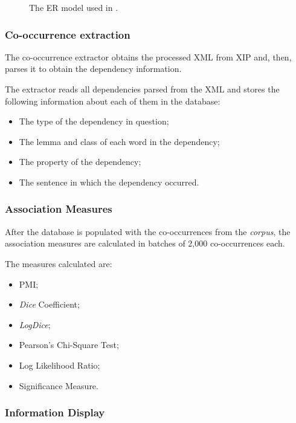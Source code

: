 \begin{figure}[ht]
\caption[ER model of (Correia et al. 2015)]{The \ac{ER} model used in
	\citep{correia2015syntax}.}
\label{fig:correira2015er}
\centering

\end{figure}

\subsubsection*{Co-occurrence extraction}

The co-occurrence extractor obtains the processed \ac{XML} from \ac{XIP} and, 
then, parses it to obtain the dependency information.

The extractor reads all dependencies parsed from the \ac{XML} and stores the 
following information about each of them in the database:

\begin{itemize}
  \item The type of the dependency in question;
  \item The lemma and class of each word in the dependency;
  \item The property of the dependency;
  \item The sentence in which the dependency occurred.
\end{itemize}

\subsubsection*{Association Measures}
\label{sec:assoc}

After the database is populated with the co-occurrences from the 
\textit{corpus}, the association measures are calculated in batches of 2,000 
co-occurrences each.

The measures calculated are:

\begin{itemize}
  \item \acl{PMI};
  \item \textit{Dice} Coefficient;
  \item \textit{LogDice};
  \item Pearson's Chi-Square Test;
  \item Log Likelihood Ratio;
  \item Significance Measure.
\end{itemize}

\subsubsection*{Information Display}

